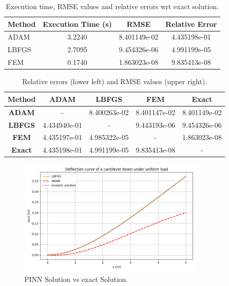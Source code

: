 \documentclass[a4paper,11pt]{article}
\begin{document}
\begin{table}[h!]
\centering
\begin{tabular}{lccc}
\toprule
\textbf{Method} & \textbf{Execution Time (s)} & \textbf{RMSE} & \textbf{Relative Error} \\
\midrule
ADAM & 3.2240 & 8.401149e-02 & 4.435198e-01 \\
LBFGS & 2.7095 & 9.454326e-06 & 4.991199e-05 \\
FEM  & 0.1740   & 1.863023e-08 & 9.835413e-08 \\
\bottomrule
\end{tabular}
\caption{Execution time, RMSE values and relative errors wrt exact solution.}
\end{table}

\begin{table}[h!]
\centering
\begin{tabular}{ccccc}
\toprule
\textbf{Method} & \textbf{ADAM} & \textbf{LBFGS} & \textbf{FEM} & \textbf{Exact} \\
\midrule
\textbf{ADAM} & - & 8.400263e-02 & 8.401147e-02 & 8.401149e-02 \\
\textbf{LBFGS}  & 4.434940e-01 & -  & 9.443193e-06 & 9.454326e-06 \\
\textbf{FEM} & 4.435197e-01 & 4.985322e-05 & - & 1.863023e-08 \\
\textbf{Exact} & 4.435198e-01 & 4.991199e-05 & 9.835413e-08 & - \\
\bottomrule
\end{tabular}
\caption{Relative errors (lower left) and RMSE values (upper right).}
\label{ComparisonFwdProblem}
\end{table}

\begin{figure}[H]
    \centering
    \includegraphics[width=0.8\textwidth]{Charts/Exact_Solution.png}
    \caption{PINN Solution vs exact Solution.}
    \label{fig:example}
\end{figure}
\end{document}
